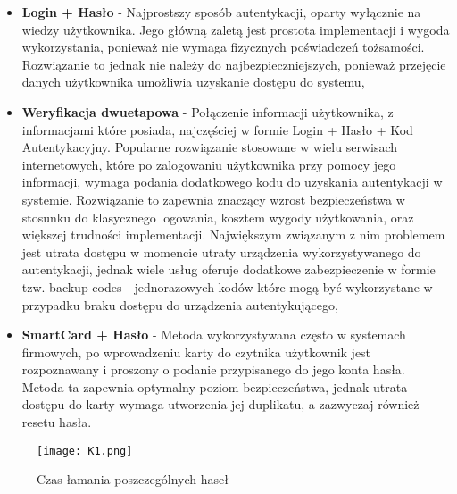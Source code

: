 \begin{itemize}
	\item \textbf{Login + Hasło} - Najprostszy sposób autentykacji, oparty wyłącznie na wiedzy użytkownika. Jego główną zaletą jest prostota implementacji i wygoda wykorzystania, ponieważ nie wymaga fizycznych poświadczeń tożsamości. Rozwiązanie to jednak nie należy do najbezpieczniejszych, ponieważ przejęcie danych użytkownika umożliwia uzyskanie dostępu do systemu,
	\item \textbf{Weryfikacja dwuetapowa} - Połączenie informacji użytkownika, z informacjami które posiada, najczęściej w formie Login + Hasło + Kod Autentykacyjny. Popularne rozwiązanie stosowane w wielu serwisach internetowych, które po zalogowaniu użytkownika przy pomocy jego informacji, wymaga podania dodatkowego kodu do uzyskania autentykacji w systemie. Rozwiązanie to zapewnia znaczący wzrost bezpieczeństwa w stosunku do klasycznego logowania, kosztem wygody użytkowania, oraz większej trudności implementacji. Największym związanym z nim problemem jest utrata dostępu w momencie utraty urządzenia wykorzystywanego do autentykacji, jednak wiele usług oferuje dodatkowe zabezpieczenie w formie tzw. backup codes - jednorazowych kodów które mogą być wykorzystane w przypadku braku dostępu do urządzenia autentykującego,
	\item \textbf{SmartCard + Hasło} - Metoda wykorzystywana często w systemach firmowych, po wprowadzeniu karty do czytnika użytkownik jest rozpoznawany i proszony o podanie przypisanego do jego konta hasła. Metoda ta zapewnia optymalny poziom bezpieczeństwa, jednak utrata dostępu do karty wymaga utworzenia jej duplikatu, a zazwyczaj również resetu hasła.
\end{itemize}

\begin{figure}[H]
	\centering
	\texttt{[image: K1.png]}
	\caption{Czas łamania poszczególnych haseł}
\end{figure}